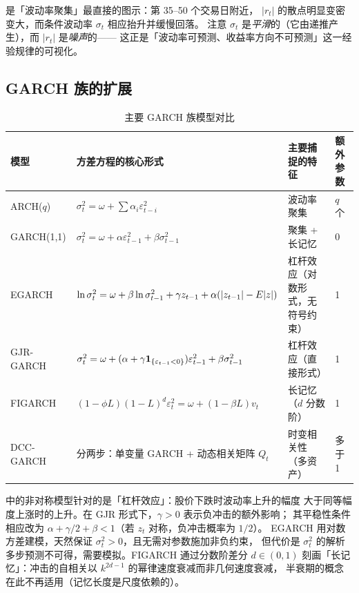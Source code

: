  是「波动率聚集」最直接的图示：第 35--50 个交易日附近，
$|r_t|$ 的散点明显变密变大，而条件波动率 $\sigma_t$ 相应抬升并缓慢回落。
注意 $\sigma_t$ 是\emph{平滑}的（它由递推产生），而 $|r_t|$ 是\emph{噪声}的——
这正是「波动率可预测、收益率方向不可预测」这一经验规律的可视化。

\subsection{GARCH 族的扩展}

\begin{table}[htbp]
\centering
\caption{主要 GARCH 族模型对比}\label{tab:09-garch-family}
\tablefont
\begin{tabular}{@{}p{2.5cm}p{5.3cm}p{4.2cm}p{1.8cm}@{}}
\toprule
模型 & 方差方程的核心形式 & 主要捕捉的特征 & 额外参数 \\
\midrule
ARCH($q$) & $\sigma_t^2=\omega+\sum\alpha_i\varepsilon_{t-i}^2$ & 波动率聚集 & $q$ 个 \\
GARCH(1,1) & $\sigma_t^2=\omega+\alpha\varepsilon_{t-1}^2+\beta\sigma_{t-1}^2$ & 聚集 + 长记忆 & 0 \\
EGARCH & $\ln\sigma_t^2=\omega+\beta\ln\sigma_{t-1}^2+\gamma z_{t-1}+\alpha(|z_{t-1}|-E|z|)$ & 杠杆效应（对数形式，无符号约束） & 1 \\
GJR-GARCH & $\sigma_t^2=\omega+(\alpha+\gamma\mathbf{1}_{\{\varepsilon_{t-1}<0\}})\varepsilon_{t-1}^2+\beta\sigma_{t-1}^2$ & 杠杆效应（直接形式） & 1 \\
FIGARCH & $(1-\phi L)(1-L)^{d}\varepsilon_t^2=\omega+(1-\beta L)v_t$ & 长记忆（$d$ 分数阶） & 1 \\
DCC-GARCH & 分两步：单变量 GARCH + 动态相关矩阵 $Q_t$ & 时变相关性（多资产） & 多于 1 \\
\bottomrule
\end{tabular}
\end{table}

 中的非对称模型针对的是「杠杆效应」：股价下跌时波动率上升的幅度
大于同等幅度上涨时的上升。在 GJR 形式下，$\gamma>0$ 表示负冲击的额外影响；
其平稳性条件相应改为 $\alpha+\gamma/2+\beta<1$（若 $z_t$ 对称，负冲击概率为 $1/2$）。
EGARCH 用对数方差建模，天然保证 $\sigma_t^2>0$，且无需对参数施加非负约束，
但代价是 $\sigma_t^2$ 的解析多步预测不可得，需要模拟。FIGARCH 通过分数阶差分 $d\in(0,1)$
刻画「长记忆」：冲击的自相关以 $k^{2d-1}$ 的幂律速度衰减而非几何速度衰减，
半衰期的概念在此不再适用（记忆长度是尺度依赖的）。

